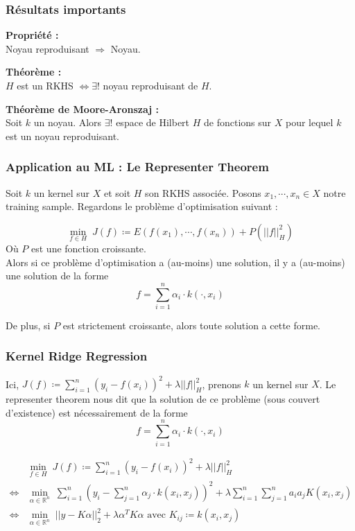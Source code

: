 \documentclass[aspectratio=169]{beamer}
\begin{document}
\begin{frame}
	\frametitle{Résultats importants}
	
	{\bf Propriété :}\\
	Noyau reproduisant $\Longrightarrow$ Noyau.
	
	\pause
	\bigskip
	
	{\bf Théorème :}\\
	$H$ est un RKHS $\Longleftrightarrow \exists !$ noyau reproduisant de $H$.
	
	\pause
	\bigskip
	
	{\bf Théorème de Moore-Aronszaj :}\\
	
	Soit $k$ un noyau. Alors $\exists !$ espace de Hilbert $H$ de fonctions sur $X$ pour lequel $k$ est un noyau reproduisant.
\end{frame}

\begin{frame}
	\frametitle{Application au ML : Le Representer Theorem}
	Soit $k$ un kernel sur $X$ et soit $H$ son RKHS associée. Posons $x_1, \cdots, x_n \in X$ notre training sample. Regardons le problème d'optimisation suivant :
	
	\[\min_{f \in H} \; J(f) \coloneqq E(f(x_1), \cdots, f(x_n)) + P(||f||_H^2)\]
	Où $P$ est une fonction croissante. \\
	
	Alors si ce problème d'optimisation a (au-moins) une solution, il y a (au-moins) une solution de la forme \[f = \sum_{i=1}^{n} \alpha_i \cdot k(\cdot, x_i)\]
	
	De plus, si $P$ est strictement croissante, alors toute solution a cette forme.
\end{frame}

\begin{frame}
	\frametitle{Kernel Ridge Regression}
	Ici, $J(f) \coloneqq \sum_{i=1}^{n} (y_i - f(x_i))^2 + \lambda ||f||_H^2$, prenons $k$ un kernel sur $X$. Le representer theorem nous dit que la solution de ce problème (sous couvert d'existence) est nécessairement de la forme 
	\[f = \sum_{i=1}^{n} \alpha_i \cdot k(\cdot, x_i)\]
	
	\pause
	
	\begin{align*}
		&\min_{f \in H} \; J(f) \coloneqq \sum_{i=1}^{n} (y_i - f(x_i))^2 + \lambda ||f||_H^2 \\
		\Longleftrightarrow& \min_{\alpha \in \mathbb{R}^n} \; \sum_{i=1}^{n} (y_i - \sum_{j=1}^{n} \alpha_j \cdot k(x_i, x_j))^2 + \lambda \sum_{i=1}^{n} \sum_{j=1}^{n} a_i a_j K(x_i, x_j) \\
		\Longleftrightarrow& \min_{\alpha \in \mathbb{R}^n} \; ||y - K \alpha||_2^2 + \lambda \alpha^T K \alpha \text{ avec $K_{ij} \coloneqq k(x_i, x_j)$}
	\end{align*}
\end{frame}
\end{document}

